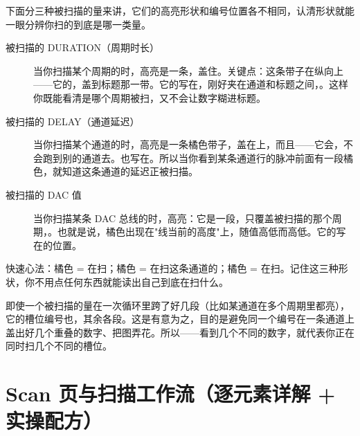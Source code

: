 \documentclass[11pt,oneside,openany]{book}
\begin{document}
下面分三种被扫描的量来讲，它们的高亮形状和编号位置各不相同，认清形状就能一眼分辨你扫的到底是哪一类量。

\begin{description}
\item[被扫描的 DURATION（周期时长）] 当你扫描某个周期的时，高亮是一条，盖住。关键点：这条带子在纵向上——它的，盖到标题那一带。它的写在，刚好夹在通道和标题之间，。这样你既能看清是哪个周期被扫，又不会让数字糊进标题。
\item[被扫描的 DELAY（通道延迟）] 当你扫描某个通道的时，高亮是一条橘色带子，盖在上，而且——它会，不会跑到别的通道去。也写在。所以当你看到某条通道行的脉冲前面有一段橘色，就知道这条通道的延迟正被扫描。
\item[被扫描的 DAC 值] 当你扫描某条 DAC 总线的时，高亮：它是一段，只覆盖被扫描的那个周期，。也就是说，橘色出现在"线当前的高度"上，随值高低而高低。它的写在的位置。
\end{description}

\begin{notebox}[怎么靠形状区分三种扫描]
快速心法：橘色 = 在扫；橘色 = 在扫这条通道的；橘色 = 在扫。记住这三种形状，你不用点任何东西就能读出自己到底在扫什么。
\end{notebox}

\begin{notebox}[编号为什么只出现一次]
即使一个被扫描的量在一次循环里跨了好几段（比如某通道在多个周期里都亮），它的槽位编号也，其余各段。这是有意为之，目的是避免同一个编号在一条通道上盖出好几个重叠的数字、把图弄花。所以——看到几个不同的数字，就代表你正在同时扫几个不同的槽位。
\end{notebox}

\section{Scan 页与扫描工作流（逐元素详解 + 实操配方）}
\end{document}
